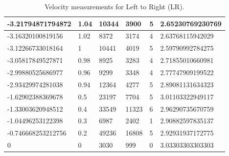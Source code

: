 \documentclass[a4paper]{report}
\numberwithin{equation}{section}
\begin{document}
\begin{table}[!ht]
\begin{tabular}{|l|l|l|l|l|l|}
        -3.21794871794872 & 1.04 & 10344 & 3900 & 5 & 2.65230769230769 \\ \hline
        -3.16320100819156 & 1.02 & 8372 & 3174 & 4 & 2.63768115942029 \\ \hline
        -3.12266733018164 & 1 & 10441 & 4019 & 5 & 2.59790992784275 \\ \hline
        -3.05817849527871 & 0.98 & 8925 & 3283 & 4 & 2.71855010660981 \\ \hline
        -2.99880525686977 & 0.96 & 9299 & 3348 & 4 & 2.77747909199522 \\ \hline
        -2.93429974281038 & 0.94 & 12364 & 4277 & 5 & 2.89081131634323 \\ \hline
        -1.62902388369678 & 0.5 & 23197 & 7704 & 5 & 3.01103322949117 \\ \hline
        -1.33003620948512 & 0.4 & 33549 & 11323 & 6 & 2.96290735670759 \\ \hline
        -1.04496253122398 & 0.3 & 6987 & 2402 & 1 & 2.90882597835137 \\ \hline
        -0.746668253212756 & 0.2 & 49236 & 16808 & 5 & 2.92931937172775 \\ \hline
        0 & 0 & 3030 & 999 & 0 & 3.03303303303303 \\ \hline
    \end{tabular}
    \caption{Velocity measurements for Left to Right (LR).}
\end{table}
\end{document}
